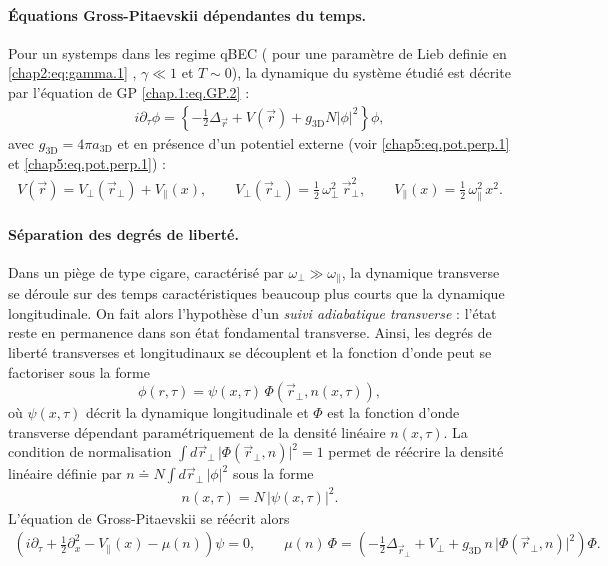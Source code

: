\paragraph{Équations Gross-Pitaevskii dépendantes du temps.}
Pour un systemps dans les regime \gls{qBEC} ( pour une paramètre de Lieb definie en \ref{chap2:eq:gamma.1} , $\gamma  \ll 1$ et $T \sim 0$), la dynamique du système étudié est décrite par l’équation de \gls{GP} \eqref{chap.1:eq.GP.2} : 
\begin{eqnarray*}
	i \partial_\tau\phi = \left \{ - \frac{1}{2}\Delta_{\vec{r}} + V(\vec{r}) + g_{\mathrm{3D}} N \vert \phi \vert^2 \right \} \phi,
\end{eqnarray*}
avec $g_{\mathrm{3D}} = 4 \pi a_{\mathrm{3D}}$ et en présence d’un potentiel externe (voir \eqref{chap5:eq.pot.perp.1} et \eqref{chap5:eq.pot.perp.1}) :
\begin{eqnarray*}
	V(\vec{r}) = V_\perp(\vec{r}_\perp) + V_\parallel(x), 
	\qquad 
	V_\perp(\vec{r}_\perp) = \tfrac{1}{2} \, \omega_\perp^2 \, \vec{r}_\perp^2, 
	\qquad 
	V_\parallel(x) = \tfrac{1}{2} \, \omega_\parallel^2 \, x^2.
\end{eqnarray*} 


\paragraph{Séparation des degrés de liberté.}
Dans un piège de type cigare, caractérisé par $\omega_\perp \gg \omega_\parallel$, la dynamique transverse se déroule sur des temps caractéristiques beaucoup plus courts que la dynamique longitudinale. On fait alors l’hypothèse d’un \emph{suivi adiabatique transverse} : l’état reste en permanence dans son état fondamental transverse. Ainsi, les degrés de liberté transverses et longitudinaux se découplent et la fonction d’onde peut se factoriser sous la forme
\begin{equation}
    \phi(r,\tau) = \psi(x,\tau)\,\Phi\!\left(\vec{r}_\perp, n(x,\tau)\right),
\end{equation}
où $\psi(x,\tau)$ décrit la dynamique longitudinale et $\Phi$ est la fonction d’onde transverse dépendant paramétriquement de la densité linéaire $n(x,\tau)$. La condition de normalisation 
\(
\int d \vec{r}_\perp \, \big|\Phi\!\left(\vec{r}_\perp, n\right)\big|^2 = 1
\)
permet de réécrire la densité linéaire définie par 
\(
n \doteq N \int d \vec{r}_\perp \, |\phi|^2
\)
sous la forme
\begin{eqnarray*}
	n(x,\tau) = N \, |\psi(x,\tau)|^2.
\end{eqnarray*}
L’équation de Gross-Pitaevskii se réécrit alors
\begin{eqnarray}
	\left( i \partial_\tau + \tfrac{1}{2} \partial_x^2 - V_\parallel(x) - \mu(n) \right) \psi = 0, 
	\qquad 
	\mu(n)\,\Phi = \left( - \tfrac{1}{2} \Delta_{\vec{r}_\perp} + V_\perp + g_{\mathrm{3D}} \, n \, \big|\Phi(\vec{r}_\perp,n)\big|^2 \right)\Phi.
\end{eqnarray}

